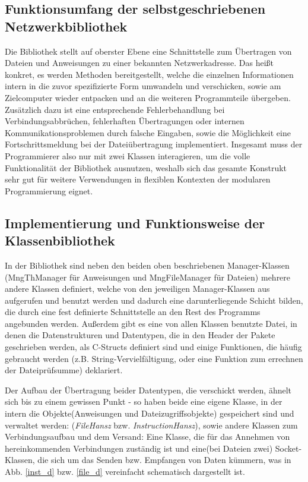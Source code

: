\subsection{Funktionsumfang der selbstgeschriebenen Netzwerkbibliothek}
Die Bibliothek stellt auf oberster Ebene eine Schnittstelle zum Übertragen von Dateien und Anweisungen zu einer bekannten Netzwerkadresse.
Das heißt konkret, es werden Methoden bereitgestellt, welche die einzelnen Informationen intern in die zuvor spezifizierte Form umwandeln und verschicken, sowie am Zielcomputer wieder entpacken und an die weiteren Programmteile übergeben.
Zusätzlich dazu ist eine entsprechende Fehlerbehandlung bei Verbindungsabbrüchen, fehlerhaften Übertragungen oder internen Kommunikationsproblemen durch falsche Eingaben, sowie die Möglichkeit eine Fortschrittsmeldung bei der Dateiübertragung implementiert.
Insgesamt muss der Programmierer also nur mit zwei Klassen interagieren, um die volle Funktionalität der Bibliothek ausnutzen, weshalb sich das gesamte Konstrukt sehr gut für weitere Verwendungen in flexiblen Kontexten der modularen Programmierung eignet.

\subsection{Implementierung und Funktionsweise der Klassenbibliothek}
In der Bibliothek sind neben den beiden oben beschriebenen Manager-Klassen (MngThManager für Anweisungen und MngFileManager für Dateien) mehrere andere Klassen definiert, welche von den jeweiligen Manager-Klassen aus aufgerufen und benutzt werden und dadurch eine darunterliegende Schicht bilden, die durch eine fest definierte Schnittstelle an den Rest des Programms angebunden werden.
Außerdem gibt es eine von allen Klassen benutzte Datei, in denen die Datenstrukturen und Datentypen, die in den Header der Pakete geschrieben werden, als C-Structs definiert sind und einige Funktionen, die häufig gebraucht werden (z.B. String-Vervielfältigung, oder eine Funktion zum errechnen der Dateiprüfsumme) deklariert.\par
Der Aufbau der Übertragung beider Datentypen, die verschickt werden, ähnelt sich bis zu einem gewissen Punkt - so haben beide eine eigene Klasse, in der intern die Objekte(Anweisungen und Dateizugriffsobjekte) gespeichert sind und verwaltet werden: (\textit{FileHansz} bzw. \textit{InstructionHansz}), sowie andere Klassen zum Verbindungsaufbau und dem Versand: Eine Klasse, die für das Annehmen von hereinkommenden Verbindungen zuständig ist und eine(bei Dateien zwei) Socket-Klassen, die sich um das Senden bzw. Empfangen von Daten kümmern, was in Abb. \ref{inst_d} bzw. \ref{file_d} vereinfacht schematisch dargestellt ist.\\\\

